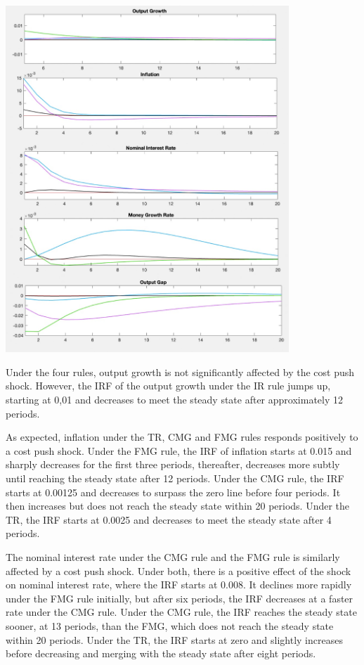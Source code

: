 \documentclass[11pt,preprint, authoryear]{elsarticle}
\let\origfigure\figure
\let\endorigfigure\endfigure
\renewenvironment{figure}[1][2] {
    \expandafter\origfigure\expandafter[H]
} {
    \endorigfigure
}
\numberwithin{equation}{section}
\numberwithin{figure}{section}
\numberwithin{table}{section}
\begin{document}
\begin{figure}
\centering
\includegraphics[width=0.8\textwidth,height=0.6\textheight]{./figures/cost-push-shock.jpeg}
\caption{Plots of Impulse Response Functions for a Cost Push Shock}
\end{figure}

Under the four rules, output growth is not significantly affected by the
cost push shock. However, the IRF of the output growth under the IR rule
jumps up, starting at 0,01 and decreases to meet the steady state after
approximately 12 periods.

As expected, inflation under the TR, CMG and FMG rules responds
positively to a cost push shock. Under the FMG rule, the IRF of
inflation starts at 0.015 and sharply decreases for the first three
periods, thereafter, decreases more subtly until reaching the steady
state after 12 periods. Under the CMG rule, the IRF starts at 0.00125
and decreases to surpass the zero line before four periods. It then
increases but does not reach the steady state within 20 periods. Under
the TR, the IRF starts at 0.0025 and decreases to meet the steady state
after 4 periods.

The nominal interest rate under the CMG rule and the FMG rule is
similarly affected by a cost push shock. Under both, there is a positive
effect of the shock on nominal interest rate, where the IRF starts at
0.008. It declines more rapidly under the FMG rule initially, but after
six periods, the IRF decreases at a faster rate under the CMG rule.
Under the CMG rule, the IRF reaches the steady state sooner, at 13
periods, than the FMG, which does not reach the steady state within 20
periods. Under the TR, the IRF starts at zero and slightly increases
before decreasing and merging with the steady state after eight periods.
\end{document}
